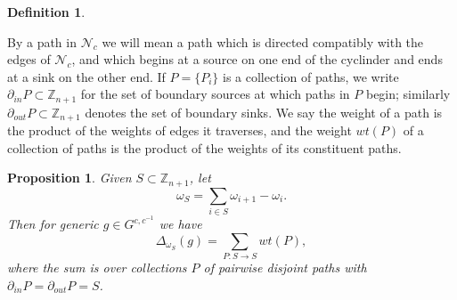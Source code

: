 \documentclass[12pt]{amsart}
\newcommand{\ZZ}{\mathbb{Z}}
\newcommand{\cN}{\mathcal{N}} %
\newtheorem{definition}[theorem]{Definition}
\newtheorem{proposition}[theorem]{Proposition}
\numberwithin{equation}{section}
\begin{document}
\begin{definition}
\begin{center}
\end{center}
\end{definition}

By a path in $\cN_c$ we will mean a path which is directed compatibly with the edges of $\cN_c$, and which begins at a source on one end of the cyclinder and ends at a sink on the other end. 
If $P = \{P_i\}$ is a collection of paths, we write $\partial_{in}P \subset \ZZ_{n+1}$ for the set of boundary sources at which paths in $P$ begin; similarly $\partial_{out}P \subset \ZZ_{n+1}$ denotes the set of boundary sinks. 
We say the weight of a path is the product of the weights of edges it traverses, and the weight $wt(P)$ of a collection of paths is the product of the weights of its constituent paths.

\begin{proposition}\label{prop:minorsfrompaths}
Given $S \subset \ZZ_{n+1}$, let
\[ \omega_S = \sum_{i \in S} \omega_{i+1} - \omega_i.\] 
Then for generic $g\in G^{c,c^{-1}}$ we have \[ \Delta_{\omega_S}(g) = \sum_{P: S \to S} wt(P), \]
where the sum is over collections $P$ of pairwise disjoint paths with $\partial_{in}P = \partial_{out}P = S$.
\end{proposition}
\end{document}
